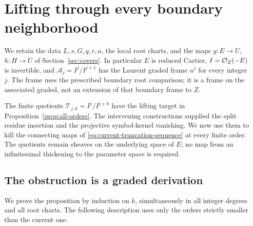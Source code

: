 \section{Lifting through every boundary neighborhood}\label{sec:lifting}

We retain the data \(L,s,G,q,r,a\), the local root charts, and the maps
\(g:E\to U\), \(h:H\to U\) of Section~\ref{sec:covers}.  In particular
\(E\) is reduced Cartier, \(I=\mathcal O_Z(-E)\) is invertible, and
\(\mathcal A_j=I^j/I^{j+1}\) has the Laurent graded frame \(u^j\) for
every integer \(j\).  The frame uses the prescribed boundary root
comparison; it is a frame on the associated graded, not an extension
of that boundary frame to \(Z\).

The finite quotients \(\mathcal T_{j,k}=I^j/I^{j+k}\) have the lifting
target in Proposition~\ref{prop:all-orders}.  The intervening
constructions supplied the split residue insertion and the projective
symbol-kernel vanishing.  We now use them to kill the connecting maps of
\eqref{eq:current-truncation-sequence} at every finite order.  The
quotients remain sheaves on the underlying space of \(E\); no map from
an infinitesimal thickening to the parameter space is required.

\subsection{The obstruction is a graded derivation}

We prove the proposition by induction on \(k\), simultaneously in all
integer degrees and all root charts.  The following description uses
only the orders strictly smaller than the current one.

